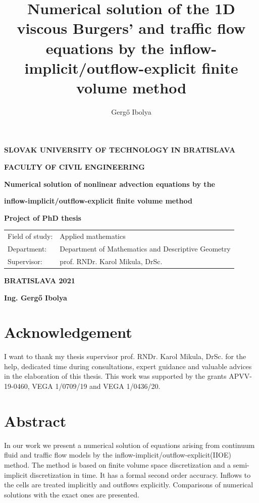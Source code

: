 \documentclass[a4paper,12pt,twoside]{report}%
\author{Gerg\H{o} Ibolya}
\title{Numerical solution of the 1D viscous Burgers' and traffic flow equations by the inflow-implicit/outflow-explicit finite volume method}
\begin{document}
	\setlength{\belowdisplayskip}{7pt} \setlength{\belowdisplayshortskip}{5pt} \setlength{\abovedisplayskip}{7pt}
	\setlength{\abovedisplayshortskip}{5pt}
	
	\thispagestyle{empty}
	{
		\topmargin=0pt
		\centerline {\large \bf{SLOVAK UNIVERSITY OF TECHNOLOGY IN BRATISLAVA}}
		\vskip 0.2cm
		\centerline{\large \bf{FACULTY OF CIVIL ENGINEERING}}
		\vskip 5cm
		\centerline{\Large \bf{Numerical solution of nonlinear advection equations by the}}
		\vskip 0.2cm
		\centerline{\Large \bf{inflow-implicit/outflow-explicit finite volume method}}
		\vskip 0.5cm
		\centerline{\large \bf{Project of PhD thesis}}
		\vskip 5cm          %
		\normalsize
		\begin{tabular}[l]{p{}p{}}
			Field of study: & Applied mathematics\\
			Department: & Department of Mathematics and Descriptive Geometry\\
			Supervisor: & prof. RNDr. Karol Mikula, DrSc. \\
		\end{tabular}
		\vskip 3cm
		\centerline{\large \bf{BRATISLAVA 2021}}
		\vskip 0.2cm
		\centerline{\large \bf{Ing. Gerg\H{o} Ibolya}}
	}
	\pagebreak
	
	\mbox{}
	\vfill
	\thispagestyle{empty}
	\section*{Acknowledgement}
	I want to thank my thesis supervisor prof. RNDr. Karol Mikula, DrSc. for the help, dedicated time during consultations, expert guidance and valuable advices in the elaboration of this thesis. This work was supported by the grants  APVV-19-0460, VEGA 1/0709/19 and VEGA 1/0436/20.
	\newpage
	
	
	\thispagestyle{empty}
	\mbox{}
	\newpage
	
	\section*{Abstract}
	\thispagestyle{empty}
In our work we present a numerical solution of equations arising from continuum fluid and traffic flow models by the inflow-implicit/outflow-explicit(IIOE) method. The method is based on finite volume space discretization and a semi-implicit discretization in time. It has a formal second order accuracy. Inflows to the cells are treated implicitly and outflows explicitly. Comparisons of numerical solutions with the exact ones are presented. 
	\newline\newline
	
\end{document}
